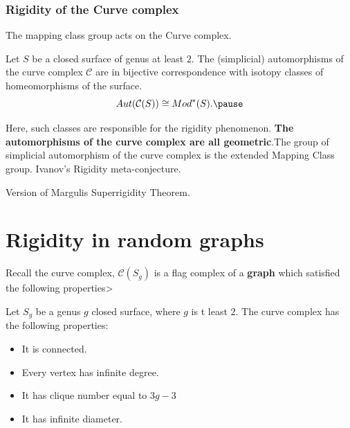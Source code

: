 \documentclass[handout]{beamer}
\theoremstyle{plain}
\begin{document}
\begin{frame} \frametitle{Rigidity  of  the  Curve  complex}
 The mapping class group acts on the Curve complex.

\begin{theorem}[Luo]

Let  $S$  be  a  closed  surface  of  genus  at  least  $2$. The (simplicial) automorphisms  of the curve complex $\mathcal{C}$ are  in bijective correspondence  with  isotopy classes of homeomorphisms  of  the  surface.   \pause 
$$Aut(\mathcal{C}(S))\cong Mod^{*}(S).\pause $$
\end{theorem}

\end{frame}

\begin{frame}
Here, such classes  are  responsible  for  the  rigidity  phenomenon. \textbf{The  automorphisms  of  the  curve  complex  are  all geometric}.\pause  The  group  of simplicial   automorphism  of  the  curve  complex  is  the  extended  Mapping  Class group. \pause Ivanov's Rigidity  meta-conjecture.

Version  of  Margulis Superrigidity Theorem. 
 

\end{frame}


\section{Rigidity in random graphs}
\begin{frame}

Recall  the  curve  complex, $\mathcal{C}(S_g)$ is a flag complex of a \textbf{graph} which satisfied the following properties>

 \begin{theorem}
Let  $S_g$ be  a  genus  $g$  closed  surface, where  $g$  is t  least $2$. 
The  curve  complex  has  the  following  properties: 
\begin{itemize}
\item  It  is  connected. 
\item Every  vertex  has  infinite degree. 
\item It  has  clique  number  equal  to $3g-3$
\item It  has infinite  diameter.  
\end{itemize}
\end{theorem}
\end{frame}
\end{document}
